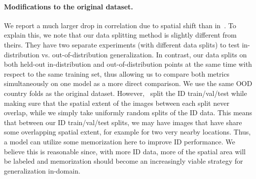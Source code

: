 \paragraph{Modifications to the original dataset.}
We report a much larger drop in correlation due to spatial shift than in~\citet{yeh2020poverty}.
To explain this, we note that our data splitting method is slightly different from theirs.
They have two separate experiments (with different data splits) to test in-distribution vs. out-of-distribution generalization.
In contrast, our data splits on both held-out in-distribution and out-of-distribution points at the same time with respect to the same training set, thus allowing us to compare both metrics simultaneously on one model as a more direct comparison.
We use the same OOD country folds as the original dataset.
However,~\citet{yeh2020poverty} split the ID train/val/test while making sure that the spatial extent of the images between each split never overlap,
while we simply take uniformly random splits of the ID data.
This means that between our ID train/val/test splits, we may have images that have share some overlapping spatial extent, for example for two very nearby locations.
Thus, a model can utilize some memorization here to improve ID performance.
We believe this is reasonable since, with more ID data, more of the spatial area will be labeled and memorization should become an increasingly viable strategy for generalization in-domain.
